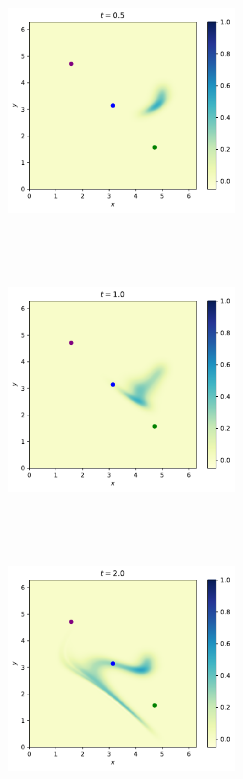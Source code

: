 \documentclass{article}
\begin{document}
\begin{figure}[H]
	\begin{subfigure}{0.5\linewidth}
		\includegraphics[width=6cm, height=6cm]{img/LWDM0_5s.pdf}
		\centering
		\caption{}
		\label{fig:tau}
	\end{subfigure}
	~
	\begin{subfigure}{0.5\linewidth}
		\includegraphics[width=6cm, height=6cm]{img/LWDM1s.pdf}
		\centering
		\caption{}
		\label{fig:tau}
	\end{subfigure}
	~
	\begin{subfigure}{0.5\linewidth}
		\includegraphics[width=6cm, height=6cm]{img/LWDM2s.pdf}
		\centering
		\caption{}
		\label{fig:tau}
	\end{subfigure}
	~
	\begin{subfigure}{0.5\linewidth}

\end{subfigure}
\end{figure}
\end{document}
